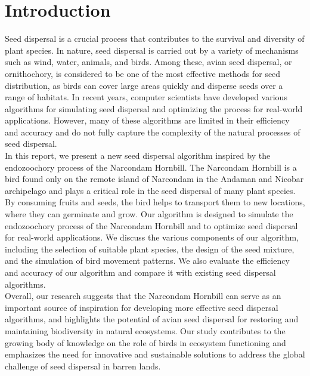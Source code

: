 \documentclass[pmlr,twocolumn,10pt]{jmlr}
\begin{document}
\section*{Introduction}
Seed dispersal is a crucial process that contributes to the survival and diversity of plant species. In nature, seed dispersal is carried out by a variety of mechanisms such as wind, water, animals, and birds. Among these, avian seed dispersal, or ornithochory, is considered to be one of the most effective methods for seed distribution, as birds can cover large areas quickly and disperse seeds over a range of habitats. In recent years, computer scientists have developed various algorithms for simulating seed dispersal and optimizing the process for real-world applications. However, many of these algorithms are limited in their efficiency and accuracy and do not fully capture the complexity of the natural processes of seed dispersal.
\\In this report, we present a new seed dispersal algorithm inspired by the endozoochory process of the Narcondam Hornbill. The Narcondam Hornbill is a bird found only on the remote island of Narcondam in the Andaman and Nicobar archipelago and plays a critical role in the seed dispersal of many plant species. By consuming fruits and seeds, the bird helps to transport them to new locations, where they can germinate and grow. Our algorithm is designed to simulate the endozoochory process of the Narcondam Hornbill and to optimize seed dispersal for real-world applications. We discuss the various components of our algorithm, including the selection of suitable plant species, the design of the seed mixture, and the simulation of bird movement patterns. We also evaluate the efficiency and accuracy of our algorithm and compare it with existing seed dispersal algorithms.
\\Overall, our research suggests that the Narcondam Hornbill can serve as an important source of inspiration for developing more effective seed dispersal algorithms, and highlights the potential of avian seed dispersal for restoring and maintaining biodiversity in natural ecosystems. Our study contributes to the growing body of knowledge on the role of birds in ecosystem functioning and emphasizes the need for innovative and sustainable solutions to address the global challenge of seed dispersal in barren lands.
\end{document}
